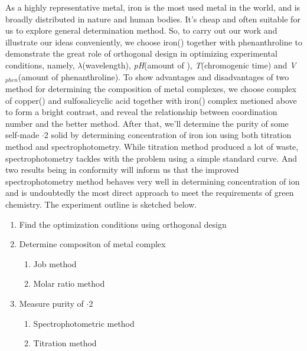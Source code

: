 As a highly representative metal, iron is the most used metal in the world, and is broadly distributed in nature and human bodies. It's cheap and often suitable for us to explore general determination method.
So, to carry out our work and illustrate our ideas conveniently, we choose iron(\uppercase\expandafter{}) together with phenanthroline to demonstrate the great role of orthogonal design in optimizing experimental conditions, namely, $\lambda$(wavelength), \emph{pH}(amount of ), \emph{T}(chromogenic time) and \emph{V$_{phen}$}(amount of phenanthroline).
To show advantages and disadvantages of two method for determining the composition of metal complexes, we choose complex of copper(\uppercase\expandafter{}) and sulfosalicyclic acid together with iron(\uppercase\expandafter{}) complex metioned above to form a bright contrast, and reveal the relationship between coordination number and the better method.
After that, we'll determine the purity of some self-made $\cdot$2 solid by determining concentration of iron ion using both titration method and spectrophotometry. While titration method produced a lot of waste, spectrophotometry tackles with the problem using a simple standard curve. And two results being in conformity will inform us that the improved spectrophotometry method behaves very well in determining concentration of ion and is undoubtedly the most direct approach to meet the requirements of green chemistry. The experiment outline is sketched below.
\begin{enumerate}
	\item Find the optimization conditions using orthogonal design
	\item Determine compositon of metal complex
	\begin{enumerate}
		\item Job method
		\item Molar ratio method
	\end{enumerate}
	\item Measure purity of $\cdot$2
	\begin{enumerate}
		\item Spectrophotometric method
		\item Titration method
	\end{enumerate}
\end{enumerate}


\ifx\SUM\undefined


\fi